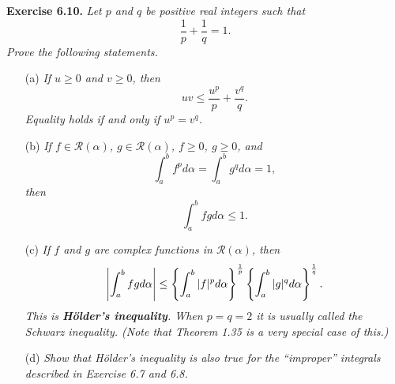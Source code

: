 \documentclass{article}
\begin{document}



\textbf{Exercise 6.10.}
\emph{Let $p$ and $q$ be positive real integers such that
\[
  \frac{1}{p} + \frac{1}{q} = 1.
\]
Prove the following statements.}
\begin{enumerate}
  \item[(a)]
  \emph{If $u \geq 0$ and $v \geq 0$, then
  \[
    uv \leq \frac{u^p}{p} + \frac{v^q}{q}.
  \]
  Equality holds if and only if $u^p = v^q$.}

  \item[(b)]
  \emph{If $f \in \mathscr{R}(\alpha)$, $g \in \mathscr{R}(\alpha)$,
  $f \geq 0$, $g \geq 0$, and
  \[
    \int_{a}^{b} f^p d\alpha = \int_{a}^{b} g^q d\alpha = 1,
  \]
  then
  \[
    \int_{a}^{b} fg d\alpha \leq 1.
  \]}

  \item[(c)]
  \emph{If $f$ and $g$ are complex functions in $\mathscr{R}(\alpha)$, then
  \[
    \abs{ \int_{a}^{b} fg d\alpha }
    \leq
    \left\{ \int_{a}^{b} |f|^p d\alpha \right\}^{\frac{1}{p}}
    \left\{ \int_{a}^{b} |g|^q d\alpha \right\}^{\frac{1}{q}}.
  \]
  This is \textbf{H\"older's inequality}.
  When $p=q=2$ it is usually called the Schwarz inequality.
  (Note that Theorem 1.35 is a very special case of this.)}

  \item[(d)]
  \emph{Show that H\"older's inequality is also true for the ``improper'' integrals
  described in Exercise 6.7 and 6.8.} \\
\end{enumerate}
\end{document}

